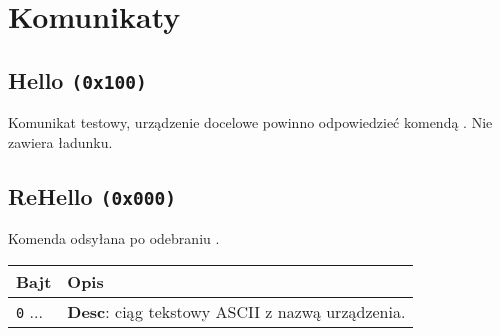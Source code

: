 \newpage

\section{Komunikaty}
\label{Sec_komunikaty}

\subsection{Hello \texttt{(0x100)}}
\label{hello}
Komunikat testowy, urządzenie docelowe powinno odpowiedzieć komendą . Nie zawiera ładunku.

\subsection{ReHello \texttt{(0x000)}}
\label{reHello}
Komenda odsyłana po odebraniu .
\begin{longtable}{|p{\BWIDTH}|p{\OWIDTH}|}
	\hline
	\textbf{Bajt} & \textbf{Opis}\\ 
	\hline
	\hline
	\texttt{0} ... & \textbf{Desc}: ciąg tekstowy ASCII z nazwą urządzenia.\\
	\hline
\end{longtable}